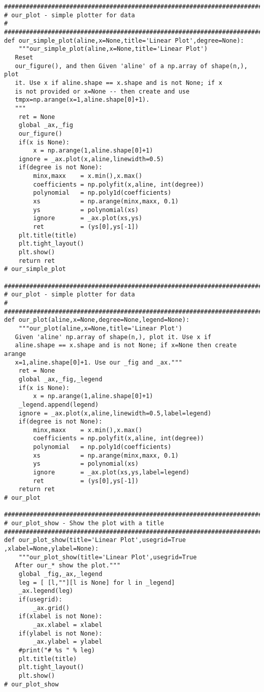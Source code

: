 {\begin{verbatim}
#############################################################################
# our_plot - simple plotter for data
#
#############################################################################
def our_simple_plot(aline,x=None,title='Linear Plot',degree=None):
    """our_simple_plot(aline,x=None,title='Linear Plot')
   Reset
   our_figure(), and then Given 'aline' of a np.array of shape(n,), plot
   it. Use x if aline.shape == x.shape and is not None; if x
   is not provided or x=None -- then create and use
   tmpx=np.arange(x=1,aline.shape[0]+1).
   """
    ret = None
    global _ax,_fig
    our_figure()
    if(x is None):
        x = np.arange(1,aline.shape[0]+1)
    ignore = _ax.plot(x,aline,linewidth=0.5)
    if(degree is not None):
        minx,maxx    = x.min(),x.max()
        coefficients = np.polyfit(x,aline, int(degree))
        polynomial   = np.poly1d(coefficients)
        xs           = np.arange(minx,maxx, 0.1)
        ys           = polynomial(xs)
        ignore       = _ax.plot(xs,ys)
        ret          = (ys[0],ys[-1])
    plt.title(title)
    plt.tight_layout()
    plt.show()
    return ret
# our_simple_plot

#############################################################################
# our_plot - simple plotter for data
#
#############################################################################
def our_plot(aline,x=None,degree=None,legend=None):
    """our_plot(aline,x=None,title='Linear Plot')
   Given 'aline' np.array of shape(n,), plot it. Use x if
   aline.shape == x.shape and is not None; if x=None then create arange
   x=1,aline.shape[0]+1. Use our _fig and _ax."""
    ret = None
    global _ax,_fig,_legend
    if(x is None):
        x = np.arange(1,aline.shape[0]+1)
    _legend.append(legend)
    ignore = _ax.plot(x,aline,linewidth=0.5,label=legend)
    if(degree is not None):
        minx,maxx    = x.min(),x.max()
        coefficients = np.polyfit(x,aline, int(degree))
        polynomial   = np.poly1d(coefficients)
        xs           = np.arange(minx,maxx, 0.1)
        ys           = polynomial(xs)
        ignore       = _ax.plot(xs,ys,label=legend)
        ret          = (ys[0],ys[-1])
    return ret
# our_plot

#############################################################################
# our_plot_show - Show the plot with a title
#############################################################################
def our_plot_show(title='Linear Plot',usegrid=True ,xlabel=None,ylabel=None):
    """our_plot_show(title='Linear Plot',usegrid=True
   After our_* show the plot."""
    global _fig,_ax,_legend
    leg = [ [l,""][l is None] for l in _legend]
    _ax.legend(leg)
    if(usegrid):
        _ax.grid()
    if(xlabel is not None):
        _ax.xlabel = xlabel
    if(ylabel is not None):
        _ax.ylabel = ylabel
    #print("# %s " % leg)
    plt.title(title)
    plt.tight_layout()
    plt.show()
# our_plot_show



\end{verbatim}}
